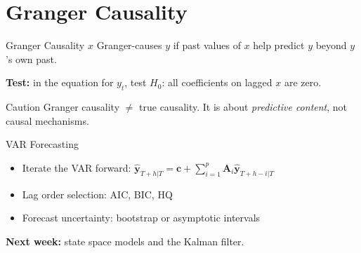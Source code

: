 \documentclass[aspectratio=169, 10pt]{beamer}
\begin{document}
\section{Granger Causality}

\begin{frame}{Granger Causality}
$x$ \alert{Granger-causes} $y$ if past values of $x$ help predict $y$ beyond $y$'s own past.

\vspace{0.5em}
\textbf{Test:} in the equation for $y_t$, test $H_0$: all coefficients on lagged $x$ are zero.

\vspace{0.5em}
\begin{block}{Caution}
Granger causality $\neq$ true causality. It is about \emph{predictive content}, not causal mechanisms.
\end{block}
\end{frame}

\begin{frame}{VAR Forecasting}
\begin{itemize}
    \item Iterate the VAR forward: $\hat{\mathbf{y}}_{T+h|T} = \mathbf{c} + \sum_{i=1}^{p} \mathbf{A}_i \hat{\mathbf{y}}_{T+h-i|T}$
    \item Lag order selection: AIC, BIC, HQ
    \item Forecast uncertainty: bootstrap or asymptotic intervals
\end{itemize}

\vspace{0.5em}
\textbf{Next week:} state space models and the Kalman filter.
\end{frame}
\end{document}
